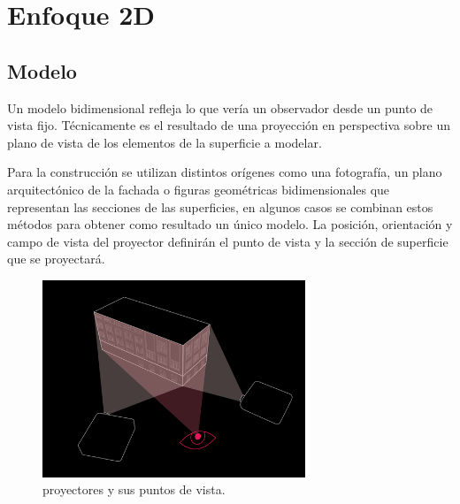 \section{Enfoque 2D}
\subsection{Modelo}
Un modelo bidimensional refleja lo que vería un observador desde un punto de vista fijo.
Técnicamente es el resultado de una proyección en perspectiva \cite{LibroCompGrafica} sobre un plano de vista de los elementos de la superficie a modelar.

Para la construcción se utilizan distintos orígenes como una fotografía, un plano arquitectónico de la fachada o figuras geométricas bidimensionales que representan las secciones de las superficies, en algunos casos se combinan estos métodos para obtener como resultado un único modelo.
La posición, orientación y campo de vista del proyector definirán el punto de vista y la sección de superficie que se proyectará.
\begin{figure}[H]
  \centering
    \includegraphics[width=0.7\textwidth]{./Cap2_videomapping/diagrama-2proyectores}
  \caption{proyectores y sus puntos de vista.}
  \label{fig:diagrama-2proyectores}
\end{figure}

